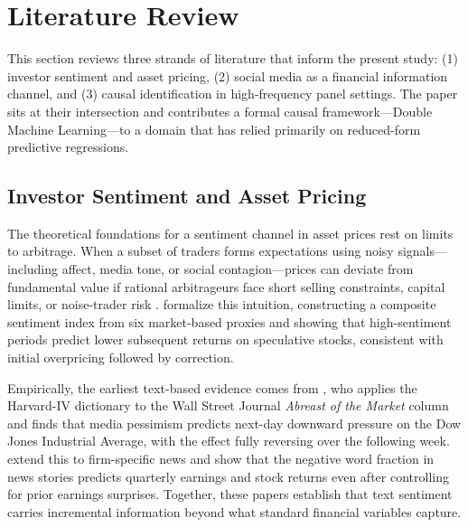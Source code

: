 
\section{Literature Review}
\label{sec:literature}

This section reviews three strands of literature that inform the present study: (1) investor
sentiment and asset pricing, (2) social media as a financial information channel, and (3) causal
identification in high-frequency panel settings. The paper sits at their intersection and
contributes a formal causal framework---Double Machine Learning---to a domain that has relied
primarily on reduced-form predictive regressions.

\subsection{Investor Sentiment and Asset Pricing}
\label{sec:lit_sentiment}

The theoretical foundations for a sentiment channel in asset prices rest on limits to arbitrage.
When a subset of traders forms expectations using noisy signals---including affect, media tone, or
social contagion---prices can deviate from fundamental value if rational arbitrageurs face short
selling constraints, capital limits, or noise-trader risk \citep{delong1990, shleifer1997}.
\citet{baker2006} formalize this intuition, constructing a composite sentiment index from six
market-based proxies and showing that high-sentiment periods predict lower subsequent returns on
speculative stocks, consistent with initial overpricing followed by correction.

Empirically, the earliest text-based evidence comes from \citet{tetlock2007}, who applies the
Harvard-IV dictionary to the Wall Street Journal \textit{Abreast of the Market} column and finds
that media pessimism predicts next-day downward pressure on the Dow Jones Industrial Average, with
the effect fully reversing over the following week. \citet{tetlock2008} extend this to
firm-specific news and show that the negative word fraction in news stories predicts quarterly
earnings and stock returns even after controlling for prior earnings surprises. Together, these
papers establish that text sentiment carries incremental information beyond what standard financial
variables capture.

